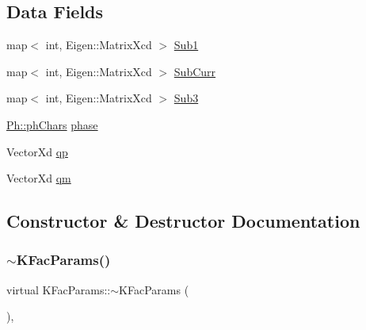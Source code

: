 \subsection*{Data Fields}
\begin{DoxyCompactItemize}
\item 
map$<$ int, Eigen\+::\+Matrix\+Xcd $>$ \mbox{\hyperlink{classKFacParams_a8948965a0d38a1ae8b6a44b9833080ef}{Sub1}}
\item 
map$<$ int, Eigen\+::\+Matrix\+Xcd $>$ \mbox{\hyperlink{classKFacParams_a29e84cd39c74d0535bc19cea03f4b6b1}{Sub\+Curr}}
\item 
map$<$ int, Eigen\+::\+Matrix\+Xcd $>$ \mbox{\hyperlink{classKFacParams_a6b8bc2a8b93ba4340e17d9c03e4a86e7}{Sub3}}
\item 
\mbox{\hyperlink{structPh_1_1phChars}{Ph\+::ph\+Chars}} \mbox{\hyperlink{classKFacParams_a11bbd8e5410736d62531d89522f73a83}{phase}}
\item 
Vector\+Xd \mbox{\hyperlink{classKFacParams_ad9669d8cc162e568d6c274d5b69bec71}{qp}}
\item 
Vector\+Xd \mbox{\hyperlink{classKFacParams_a1554adf6e901c25d34d29e84f91090a9}{qm}}
\end{DoxyCompactItemize}


\subsection{Constructor \& Destructor Documentation}
\mbox{\label{classKFacParams_a6fd85cbed3c5b08e892084759f12efbd}} 
\subsubsection{\texorpdfstring{$\sim$KFacParams()}{~KFacParams()}}
{\footnotesize\ttfamily virtual K\+Fac\+Params\+::$\sim$\+K\+Fac\+Params (\begin{DoxyParamCaption}{ }\end{DoxyParamCaption})\hspace{0.3cm}{\ttfamily [inline]}, {\ttfamily [virtual]}}

\mbox{\label{classKFacParams_af8bd9e570a48e06e183f37a0dda441a4}} 
